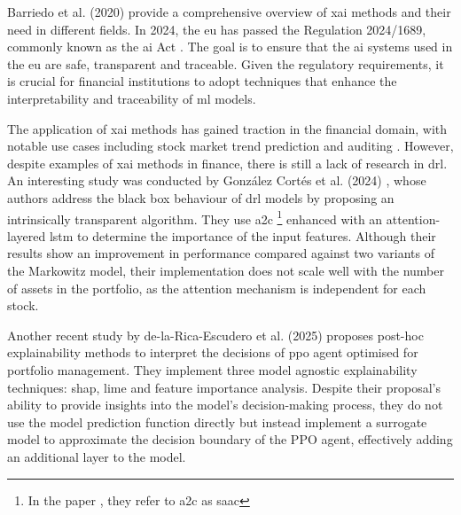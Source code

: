 Barriedo et al. (2020) \cite{BarredoArrieta2019} provide a comprehensive overview of \acrfull{xai} methods and their need in different fields. In 2024, the \acrlong{eu} has passed the Regulation 2024/1689, commonly known as the \acrshort{ai} Act \cite{AIAct2024}. The goal is to ensure that the \acrshort{ai} systems used in the \acrlong{eu} are safe, transparent and traceable. Given the regulatory requirements, it is crucial for financial institutions to adopt techniques that enhance the interpretability and traceability of \acrshort{ml} models.

The application of \acrshort{xai} methods has gained traction in the financial domain, with notable use cases including stock market trend prediction \cite{Mandeep2022} and auditing \cite{Zhang2022}. However, despite examples of \acrshort{xai} methods in finance, there is still a lack of research in \acrshort{drl}. An interesting study was conducted by González Cortés et al. (2024) \cite{Cortes2024}, whose authors address the black box behaviour of \acrshort{drl} models by proposing an intrinsically transparent algorithm. They use \acrfull{a2c} \footnote{In the paper \cite{Cortes2024}, they refer to \acrshort{a2c} as \acrfull{saac}} enhanced with an attention-layered \acrshort{lstm} to determine the importance of the input features. Although their results show an improvement in performance compared against two variants of the Markowitz model, their implementation does not scale well with the number of assets in the portfolio, as the attention mechanism is independent for each stock.

Another recent study by de-la-Rica-Escudero et al. (2025) \cite{de-La-Rica-Escudero2025} proposes post-hoc explainability methods to interpret the decisions of \acrshort{ppo} agent optimised for portfolio management. They implement three model agnostic explainability techniques: \acrshort{shap}, \acrshort{lime} and feature importance analysis. Despite their proposal's ability to provide insights into the model's decision-making process, they do not use the model prediction function directly but instead implement a surrogate model to approximate the decision boundary of the PPO agent, effectively adding an additional layer to the model.